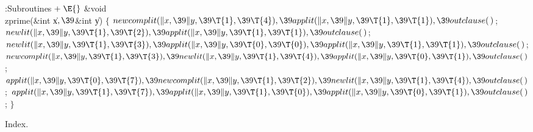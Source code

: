 \Y\B\4:Subroutines\X${}\mathrel+\E{}$\6
\&{void} \\{zprime}(\&{int} \|x${},\39{}$\&{int} \|y)\1\1\2\2\6
${}\{{}$\1\6
${}\\{newcomplit}(\|x,\39\|y,\39\T{1},\39\T{4}),\39\\{applit}(\|x,\39\|y,\39%
\T{1},\39\T{1}),\39\\{outclause}(\,){}$;\6
${}\\{newlit}(\|x,\39\|y,\39\T{1},\39\T{2}),\39\\{applit}(\|x,\39\|y,\39\T{1},%
\39\T{1}),\39\\{outclause}(\,){}$;\6
${}\\{newlit}(\|x,\39\|y,\39\T{1},\39\T{3}),\39\\{applit}(\|x,\39\|y,\39\T{0},%
\39\T{0}),\39\\{applit}(\|x,\39\|y,\39\T{1},\39\T{1}),\39\\{outclause}(\,){}$;%
\6
${}\\{newcomplit}(\|x,\39\|y,\39\T{1},\39\T{3}),\39\\{newlit}(\|x,\39\|y,\39%
\T{1},\39\T{4}),\39\\{applit}(\|x,\39\|y,\39\T{0},\39\T{1}),\39\\{outclause}(%
\,){}$;\6
${}\\{applit}(\|x,\39\|y,\39\T{0},\39\T{7}),\39\\{newcomplit}(\|x,\39\|y,\39%
\T{1},\39\T{2}),\39\\{newlit}(\|x,\39\|y,\39\T{1},\39\T{4}),\39\\{outclause}(%
\,){}$;\6
${}\\{applit}(\|x,\39\|y,\39\T{1},\39\T{7}),\39\\{applit}(\|x,\39\|y,\39\T{1},%
\39\T{0}),\39\\{applit}(\|x,\39\|y,\39\T{0},\39\T{1}),\39\\{outclause}(\,){}$;%
\6
\4${}\}{}$\2\par
\fi

Index.
\fi

\inx
\fin
\con
